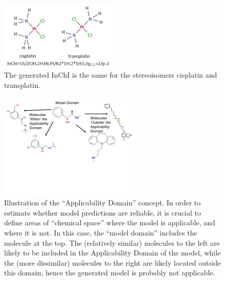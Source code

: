 \documentclass{sig-alternate}
\begin{document}
\begin{figure}
\centering
\includegraphics[height=1.3in]{platins.png}
\caption{The generated InChI is the same for the stereoisomers cisplatin and transplatin.}
\label{figure:cistrans}
\end{figure}
%
\begin{figure}
\centering
\includegraphics[height=2in]{CACM_ApplicabilityDomain.pdf}
\caption{Illustration of the ``Applicability Domain'' concept. In order to estimate whether model predictions are reliable, it is crucial to define areas of ``chemical space'' where the model is applicable, and where it is not. In this case, the ``model domain'' includes the molecule at the top. The (relatively similar) molecules to the left are likely to be included in the Applicability Domain of the model, while the (more dissimilar) molecules to the right are likely located outside this domain, hence the generated model is probably not applicable.}
\label{figure:applicability-domain}
\end{figure}
%
\end{document}
